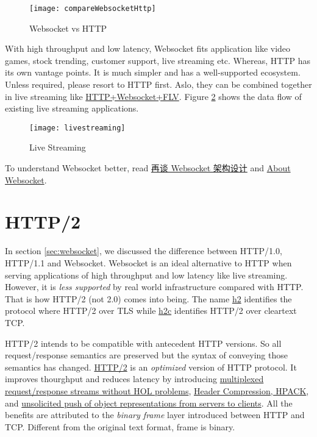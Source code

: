 \begin{figure}[!htb]
  \centering
  \texttt{[image: compareWebsocketHttp]}
  \caption{Websocket vs HTTP}
  \label{fig:websocket-vs-http}
\end{figure}

With high throughput and low latency, Websocket fits application
like video games, stock trending, customer support, live streaming
etc. Whereas, HTTP has its own vantage points. It is much simpler
and has a well-supported ecosystem. Unless required, please resort
to HTTP first. Aslo, they can be combined together in live
streaming like \uline{HTTP+Websocket+FLV}. Figure
\ref{fig:live-streaming} shows the data flow of existing live
streaming applications.

\begin{figure}[!htb]
  \centering
  \texttt{[image: livestreaming]}
  \caption{Live Streaming}
  \label{fig:live-streaming}
\end{figure}

To understand Websocket better, read
\href{http://www.importnew.com/28036.html}{再谈 Websocket 架构设计}
and \href{http://www.websocket.org/aboutwebsocket.html}{About
  Websocket}.

\section{HTTP/2}
\label{sec:http2}

In section \ref{sec:websocket}, we discussed the difference
between HTTP/1.0, HTTP/1.1 and Websocket. Websocket is an ideal
alternative to HTTP when serving applications of high throughput
and low latency like live streaming. However, it is \textit{less
  supported} by real world infrastructure compared with HTTP. That
is how HTTP/2 (not 2.0) comes into being. The name \uline{h2}
identifies the protocol where HTTP/2 over TLS while \uline{h2c}
identifies HTTP/2 over cleartext TCP.

HTTP/2 intends to be compatible with antecedent HTTP versions. So
all request/response semantics are preserved but the syntax of
conveying those semantics has
changed. \href{https://tools.ietf.org/html/rfc7540}{HTTP/2} is an
\textit{optimized} version of HTTP protocol. It improves
thourghput and reduces latency by introducing \uline{multiplexed
  request/response streams without HOL problems}, \uline{Header
  Compression, HPACK}, and \uline{unsolicited push of object
  representations from servers to clients}. All the benefits are
attributed to the \textit{binary frame} layer introduced between
HTTP and TCP. Different from the original text format, frame is
binary.

